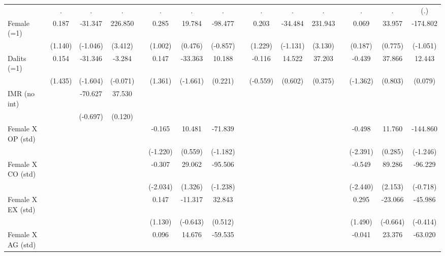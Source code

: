 {\begin{longtable}{@{\extracolsep{\fill}}lccccccccccccccc}
          & .     & .     & .     &       & .     & .     & .     &       & .     & .     & .     &       & .     & .     & (.) \\
    Female (=1) & 0.187 & -31.347 & 226.850 &       & 0.285 & 19.784 & -98.477 &       & 0.203 & -34.484 & 231.943 &       & 0.069 & 33.957 & -174.802 \\
          & (1.140) & (-1.046) & (3.412) &       & (1.002) & (0.476) & (-0.857) &       & (1.229) & (-1.131) & (3.130) &       & (0.187) & (0.775) & (-1.051) \\
    Dalits (=1) & 0.154 & -31.346 & -3.284 &       & 0.147 & -33.363 & 10.188 &       & -0.116 & 14.522 & 37.203 &       & -0.439 & 37.866 & 12.443 \\
          & (1.435) & (-1.604) & (-0.071) &       & (1.361) & (-1.661) & (0.221) &       & (-0.559) & (0.602) & (0.375) &       & (-1.362) & (0.803) & (0.079) \\
    IMR (no int) &       & -70.627 & 37.530 &       &       &       &       &       &       &       &       &       &       &       &  \\
          &       & (-0.697) & (0.120) &       &       &       &       &       &       &       &       &       &       &       &  \\
    Female X OP (std) &       &       &       &       & -0.165 & 10.481 & -71.839 &       &       &       &       &       & -0.498 & 11.760 & -144.860 \\
          &       &       &       &       & (-1.220) & (0.559) & (-1.182) &       &       &       &       &       & (-2.391) & (0.285) & (-1.246) \\
    Female X CO (std) &       &       &       &       & -0.307 & 29.062 & -95.506 &       &       &       &       &       & -0.549 & 89.286 & -96.229 \\
          &       &       &       &       & (-2.034) & (1.326) & (-1.238) &       &       &       &       &       & (-2.440) & (2.153) & (-0.718) \\
    Female X EX (std) &       &       &       &       & 0.147 & -11.317 & 32.843 &       &       &       &       &       & 0.295 & -23.066 & -45.986 \\
          &       &       &       &       & (1.130) & (-0.643) & (0.512) &       &       &       &       &       & (1.490) & (-0.664) & (-0.414) \\
    Female X AG (std) &       &       &       &       & 0.096 & 14.676 & -59.535 &       &       &       &       &       & -0.041 & 23.376 & -63.020 \\

\end{longtable}}
